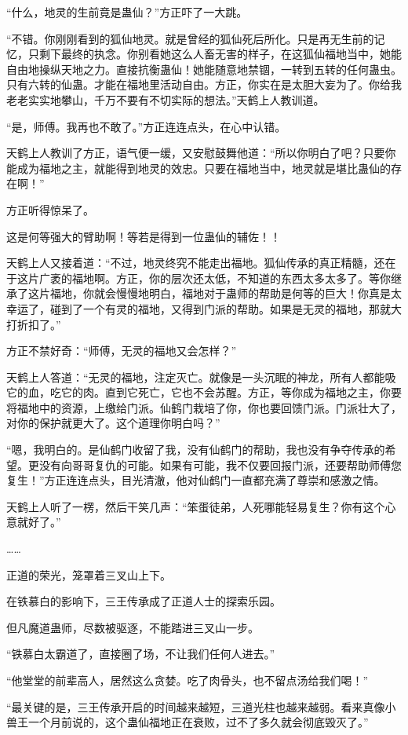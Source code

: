 \begin{this_body}
“什么，地灵的生前竟是蛊仙？”方正吓了一大跳。

“不错。你刚刚看到的狐仙地灵。就是曾经的狐仙死后所化。只是再无生前的记忆，只剩下最终的执念。你别看她这么人畜无害的样子，在这狐仙福地当中，她能自由地操纵天地之力。直接抗衡蛊仙！她能随意地禁锢，一转到五转的任何蛊虫。只有六转的仙蛊。才能在福地里活动自由。方正，你实在是太胆大妄为了。你给我老老实实地攀山，千万不要有不切实际的想法。”天鹤上人教训道。

“是，师傅。我再也不敢了。”方正连连点头，在心中认错。

天鹤上人教训了方正，语气便一缓，又安慰鼓舞他道：“所以你明白了吧？只要你能成为福地之主，就能得到地灵的效忠。只要在福地当中，地灵就是堪比蛊仙的存在啊！”

方正听得惊呆了。

这是何等强大的臂助啊！等若是得到一位蛊仙的辅佐！！

天鹤上人又接着道：“不过，地灵终究不能走出福地。狐仙传承的真正精髓，还在于这片广袤的福地啊。方正，你的层次还太低，不知道的东西太多太多了。等你继承了这片福地，你就会慢慢地明白，福地对于蛊师的帮助是何等的巨大！你真是太幸运了，碰到了一个有灵的福地，又得到门派的帮助。如果是无灵的福地，那就大打折扣了。”

方正不禁好奇：“师傅，无灵的福地又会怎样？”

天鹤上人答道：“无灵的福地，注定灭亡。就像是一头沉眠的神龙，所有人都能吸它的血，吃它的肉。直到它死亡，它也不会苏醒。方正，等你成为福地之主，你要将福地中的资源，上缴给门派。仙鹤门栽培了你，你也要回馈门派。门派壮大了，对你的保护就更大了。这个道理你明白吗？”

“嗯，我明白的。是仙鹤门收留了我，没有仙鹤门的帮助，我也没有争夺传承的希望。更没有向哥哥复仇的可能。如果有可能，我不仅要回报门派，还要帮助师傅您复生！”方正连连点头，目光清澈，他对仙鹤门一直都充满了尊崇和感激之情。

天鹤上人听了一楞，然后干笑几声：“笨蛋徒弟，人死哪能轻易复生？你有这个心意就好了。”

……

正道的荣光，笼罩着三叉山上下。

在铁慕白的影响下，三王传承成了正道人士的探索乐园。

但凡魔道蛊师，尽数被驱逐，不能踏进三叉山一步。

“铁慕白太霸道了，直接圈了场，不让我们任何人进去。”

“他堂堂的前辈高人，居然这么贪婪。吃了肉骨头，也不留点汤给我们喝！”

“最关键的是，三王传承开启的时间越来越短，三道光柱也越来越弱。看来真像小兽王一个月前说的，这个蛊仙福地正在衰败，过不了多久就会彻底毁灭了。”


\end{this_body}
